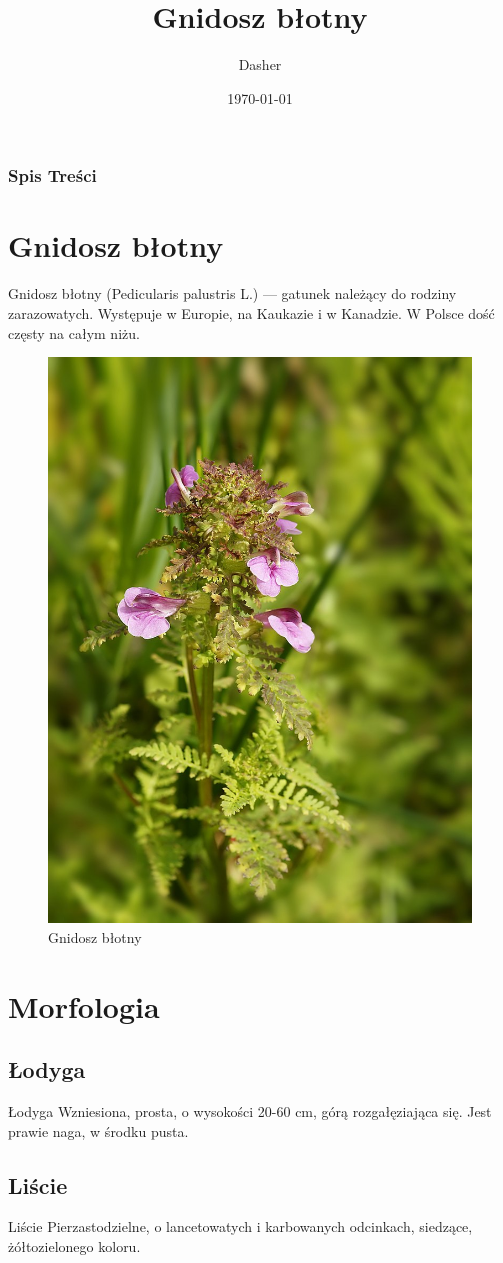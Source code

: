 \documentclass{beamer}
\title{Gnidosz błotny}
\author{Dasher}
\date{\today}
\begin{document}
\frame{\titlepage}

\begin{frame}
	\frametitle{Spis Treści}
	\tableofcontents
\end{frame}

\section{Gnidosz błotny}
\begin{frame}{Gnidosz błotny}
(Pedicularis palustris L.) ---  gatunek należący do rodziny zarazowatych. Występuje w Europie, na Kaukazie i w Kanadzie. W Polsce dość częsty na całym niżu.
\begin{figure}
\centering
\includegraphics[width=0.25\hsize]{kwiat.jpg}
\caption{Gnidosz błotny}
\end{figure}
\end{frame}

\section{Morfologia}
\subsection{Łodyga}
\begin{frame}{Łodyga}
Wzniesiona, prosta, o wysokości 20-60 cm, górą rozgałęziająca się. Jest prawie naga, w środku pusta.
\end{frame}

\subsection{Liście}
\begin{frame}{Liście}
Pierzastodzielne, o lancetowatych i karbowanych odcinkach, siedzące, żółtozielonego koloru.
\end{frame}
\end{document}
